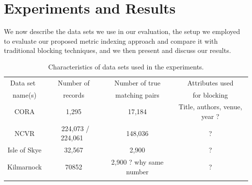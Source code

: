 \documentclass{llncs}
\begin{document}




\section{Experiments and Results}
\label{sec-exp}

We now describe the data sets we use in our evaluation, the setup we
employed to evaluate our proposed metric indexing approach and
compare it with traditional blocking techniques, and we then present
and discuss our results.



\begin{table}[t]
\caption{Characteristics of data sets used in the experiments.}
 \label{table-datasets}
  \centering
  \begin{scriptsize}
  \begin{tabular}{cccc}
  \hline\noalign{\smallskip}
  Data set~ & ~Number of~ & ~Number of true~ & Attributes used \\
  name(s)  & records  & matching pairs & for blocking \\
  \noalign{\smallskip} \hline \noalign{\smallskip}
  CORA  & 1,295 & 17,184 & Title, authors, venue, year ? \\
  NCVR  & ~224,073 / 224,061~ & ~148,036~ & ? \\
  Isle of Skye & 32,567 & 2,900 & ? \\
  Kilmarnock  & 70852 & 2,900 ? why same number & ? \\
  \noalign{\smallskip} \hline
  \end{tabular}
  \end{scriptsize}
\end{table}

\end{document}
